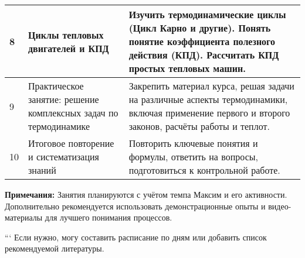 \documentclass{article}
\begin{document}
\begin{tabular}{|p{3cm}|p{7cm}|p{5cm}|}
\hline
8 & Циклы тепловых двигателей и КПД & Изучить термодинамические циклы (Цикл Карно и другие). Понять понятие коэффициента полезного действия (КПД). Рассчитать КПД простых тепловых машин. \\
\hline
9 & Практическое занятие: решение комплексных задач по термодинамике & Закрепить материал курса, решая задачи на различные аспекты термодинамики, включая применение первого и второго законов, расчёты работы и теплот. \\
\hline
10 & Итоговое повторение и систематизация знаний & Повторить ключевые понятия и формулы, ответить на вопросы, подготовиться к контрольной работе. \\
\hline
\end{tabular}

\vspace{0.5cm}

\textbf{Примечания:} Занятия планируются с учётом темпа Максим и его активности. Дополнительно рекомендуется использовать демонстрационные опыты и видео-материалы для лучшего понимания процессов.

```
Если нужно, могу составить расписание по дням или добавить список рекомендуемой литературы.
\end{document}

